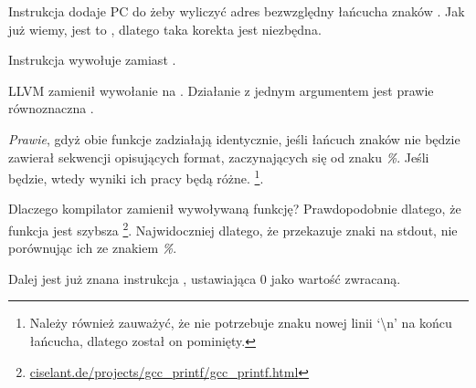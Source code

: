 Instrukcja  dodaje \ac{PC} do  żeby wyliczyć adres bezwzględny łańcucha znaków . Jak już wiemy, jest to \q{\PICcode}, dlatego taka korekta jest niezbędna.

Instrukcja  wywołuje \puts zamiast \printf.

\label{puts}
LLVM zamienił wywołanie \printf na \puts.
Działanie \printf z jednym argumentem jest prawie równoznaczna \puts.
 
\emph{Prawie}, gdyż obie funkcje zadziałają identycznie, jeśli łańcuch znaków nie będzie zawierał sekwencji opisujących format, zaczynających się od znaku \emph{\%}. Jeśli będzie, wtedy wyniki ich pracy będą różne.
\footnote{Należy również zauważyć, że \puts nie potrzebuje znaku nowej linii `\textbackslash{}n' na końcu łańcucha,
dlatego został on pominięty.}.

Dlaczego kompilator zamienił wywoływaną funkcję? Prawdopodobnie dlatego, że funkcja \puts jest szybsza
\footnote{\href{http://go.yurichev.com/17063}{ciselant.de/projects/gcc\_printf/gcc\_printf.html}}. 
Najwidoczniej dlatego, że \puts przekazuje znaki na \gls{stdout}, nie porównując ich ze znakiem \emph{\%}.

Dalej jest już znana instrukcja , ustawiająca 0 jako wartość zwracaną.



